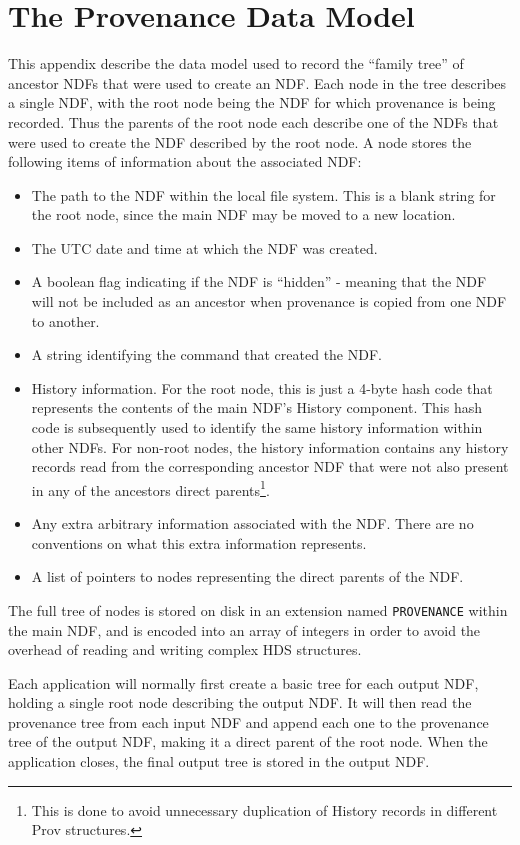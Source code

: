 \documentclass[final,authoryear,5p,times,twocolumn]{elsarticle}
\begin{document}
\section{The Provenance Data Model}
\label{app:prov}
This appendix describe the data model used to record the ``family tree'' of
ancestor NDFs that were used to create an NDF. Each node in the tree
describes a single NDF, with the root node being the NDF for which
provenance is being recorded. Thus the parents of the root node each
describe one of the NDFs that were used to create the NDF described by the
root node. A node stores the following items of information about the
associated NDF:

\begin{itemize}
\item The path to the NDF within the local file system. This is a blank
string for the root node, since the main NDF may be moved to a new location.
\item The UTC date and time at which the NDF was created.
\item A boolean flag indicating if the NDF is ``hidden'' - meaning that
the NDF will not be included as an ancestor when provenance is copied
from one NDF to another.
\item A string identifying the command that created the NDF.
\item History information. For the root node, this is just a 4-byte hash code
that represents the contents of the main NDF's History component. This hash
code is subsequently used to identify the same history information within other
NDFs. For non-root nodes, the history information contains any history
records read from the corresponding ancestor NDF that were not also present
in any of the ancestors direct parents\footnote{This is done to avoid unnecessary
duplication of History records in different Prov structures.}.
\item Any extra arbitrary information associated with the NDF. There are no conventions on what this extra information
represents.
\item A list of pointers to nodes representing the direct parents of the
NDF.
\end{itemize}

The full tree of nodes is stored on disk in an extension named
\texttt{PROVENANCE} within the main NDF, and is encoded into an array of
integers in order to avoid the overhead of reading and writing complex
HDS structures.

Each application will normally first create a basic tree for each output
NDF, holding a single root node describing the output NDF. It will then
read the provenance tree from each input NDF and append each one to the
provenance tree of the output NDF, making it a direct parent of the root
node. When the application closes, the final output tree is stored in
the output NDF.
\end{document}
